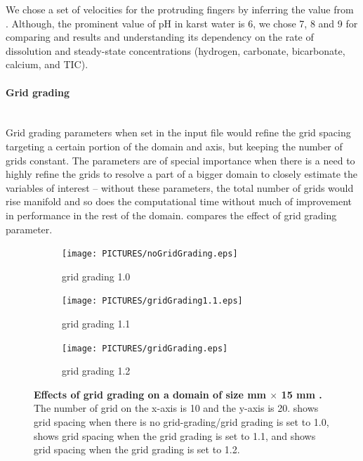 We chose a set of velocities for the protruding fingers by inferring the value from \citet{Class2020}. 
Although, the prominent value of pH in karst water is 6, we chose 7, 8 and 9 for comparing \DuMuX and 
\MATLAB results and understanding its dependency on the rate of dissolution and steady-state concentrations 
(hydrogen, carbonate, bicarbonate, calcium, and TIC). \\

\newpage
\paragraph*{Grid grading}\label{para:definitionGridGrading} \mbox{} \\ 

Grid grading parameters when set in the input file would refine the grid 
spacing targeting a certain portion of the domain and axis, but keeping the number of grids constant. 
The parameters are of special importance when there is a need to highly refine the grids to resolve a part 
of a bigger domain to closely estimate the variables of interest -- without these parameters, the total number 
of grids would rise manifold and so does the computational time without much of improvement in performance in 
the rest of the domain.  compares the effect of grid grading parameter. \\
\begin{figure}[!h]
        \centering
    \begin{subfigure}{.3\linewidth}
        \centering
        \texttt{[image: PICTURES/noGridGrading.eps]}
        \caption{\small grid grading 1.0}
        \label{fig:nogg}       %
    \end{subfigure}%
        \hfill
    \begin{subfigure}{.3\linewidth}
        \centering
        \texttt{[image: PICTURES/gridGrading1.1.eps]}
        \caption{\small grid grading 1.1}
        \label{fig:gg1.1}       %
    \end{subfigure}%
    \hfill
    \begin{subfigure}{.3\linewidth}
        \centering
        \texttt{[image: PICTURES/gridGrading.eps]}
        \caption{\small grid grading 1.2}
        \label{fig:gg1.2}       %
    \end{subfigure}
        \hfill
     \caption [Effects of grid grading on a domain of size   mm $\times$ 15 mm \rbrack.] {\textbf{Effects of grid 
     grading on a domain of size  mm $\times$ 15 mm \rbrack.} \small The number of grid on the x-axis is 
     10 and the y-axis is 20.  shows grid spacing when there is no grid-grading/grid grading is set to 1.0, 
      shows grid spacing when the grid grading is set to 1.1, and  shows grid spacing when the grid grading is set to 1.2.}
     \label{fig:gridGrading}
\end{figure}


